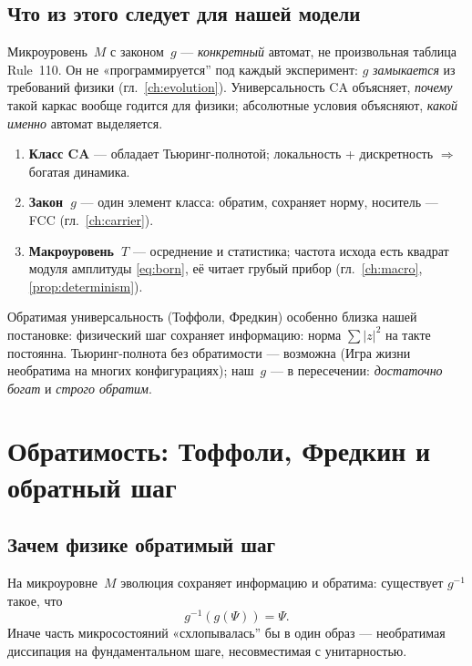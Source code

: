 \subsection{Что из этого следует для нашей модели}

Микроуровень~$M$ с законом~$g$ --- \emph{конкретный} автомат, не произвольная таблица Rule~110.
Он не «программируется'' под каждый эксперимент: $g$ \emph{замыкается} из требований физики
(гл.~\ref{ch:evolution}).
Универсальность CA объясняет, \emph{почему} такой каркас вообще годится для физики;
абсолютные условия объясняют, \emph{какой именно} автомат выделяется.

\begin{remark}
\begin{enumerate}
\item \textbf{Класс CA} --- обладает Тьюринг-полнотой; локальность + дискретность $\Rightarrow$ богатая динамика.
\item \textbf{Закон~$g$} --- один элемент класса: обратим, сохраняет норму,
  носитель --- FCC (гл.~\ref{ch:carrier}).
\item \textbf{Макроуровень~$T$} --- осреднение и статистика; частота исхода есть квадрат модуля амплитуды \eqref{eq:born}, её читает грубый прибор (гл.~\ref{ch:macro}, \cref{prop:determinism}).
\end{enumerate}
\end{remark}

Обратимая универсальность (Тоффоли, Фредкин) особенно близка нашей постановке:
физический шаг сохраняет информацию: норма $\sum|z|^2$ на такте постоянна.
Тьюринг-полнота без обратимости --- возможна (Игра жизни необратима на многих конфигурациях);
наш~$g$ --- в пересечении: \emph{достаточно богат} и \emph{строго обратим}.

\section{Обратимость: Тоффоли, Фредкин и обратный шаг}

\subsection{Зачем физике обратимый шаг}

На микроуровне~$M$ эволюция сохраняет информацию и обратима: существует $g^{-1}$ такое, что
\[
g^{-1}(g(\Psi))=\Psi.
\]
Иначе часть микросостояний «схлопывалась'' бы в один образ --- необратимая диссипация
на фундаментальном шаге, несовместимая с унитарностью.

